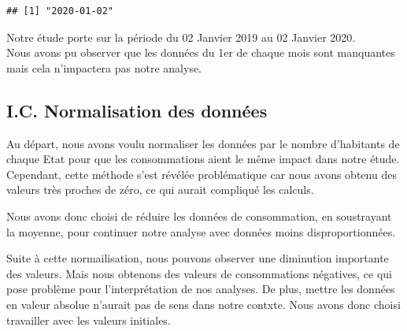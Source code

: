 \documentclass[
]{article}
\newenvironment{Shaded}{\begin{snugshade}}{\end{snugshade}}
\newcommand{\ControlFlowTok}[1]{\textcolor[rgb]{0.13,0.29,0.53}{\textbf{#1}}}
\newcommand{\DecValTok}[1]{\textcolor[rgb]{0.00,0.00,0.81}{#1}}
\newcommand{\FunctionTok}[1]{\textcolor[rgb]{0.00,0.00,0.00}{#1}}
\newcommand{\NormalTok}[1]{#1}
\newcommand{\OtherTok}[1]{\textcolor[rgb]{0.56,0.35,0.01}{#1}}
\newcommand{\SpecialCharTok}[1]{\textcolor[rgb]{0.00,0.00,0.00}{#1}}
\begin{document}
\begin{verbatim}
## [1] "2020-01-02"
\end{verbatim}

Notre étude porte sur la période du 02 Janvier 2019 au 02 Janvier
2020.\\
Nous avons pu observer que les données du 1er de chaque mois sont
manquantes mais cela n'impactera pas notre analyse.

\hypertarget{i.c.-normalisation-des-donnuxe9es}{%
\subsection{I.C. Normalisation des
données}\label{i.c.-normalisation-des-donnuxe9es}}

Au départ, nous avons voulu normaliser les données par le nombre
d'habitants de chaque Etat pour que les consommations aient le même
impact dans notre étude. Cependant, cette méthode s'est révélée
problématique car nous avons obtenu des valeurs très proches de zéro, ce
qui aurait compliqué les calculs.

Nous avons donc choisi de réduire les données de consommation, en
soustrayant la moyenne, pour continuer notre analyse avec données moins
disproportionnées.

\begin{Shaded}
\end{Shaded}

Suite à cette normailisation, nous pouvons observer une diminution
importante des valeurs. Mais nous obtenons des valeurs de consommations
négatives, ce qui pose problème pour l'interprétation de nos analyses.
De plus, mettre les données en valeur absolue n'aurait pas de sens dans
notre contxte. Nous avons donc choisi travailler avec les valeurs
initiales.
\end{document}

